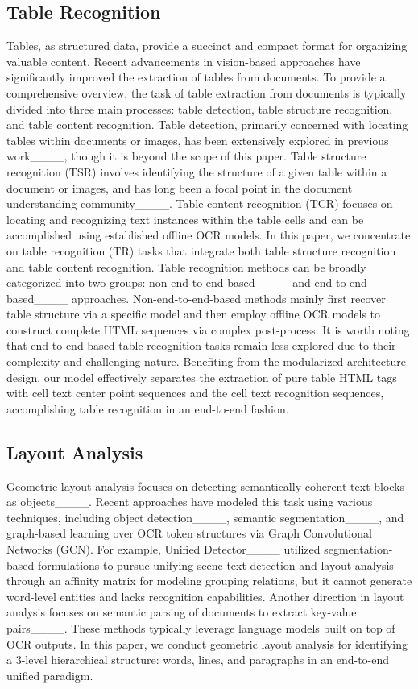 \subsection{Table Recognition}
Tables, as structured data, provide a succinct and compact format for organizing valuable content. Recent advancements in vision-based approaches have significantly improved the extraction of tables from documents. To provide a comprehensive overview, the task of table extraction from documents is typically divided into three main processes: table detection, table structure recognition, and table content recognition. Table detection, primarily concerned with locating tables within documents or images, has been extensively explored in previous work____, though it is beyond the scope of this paper. Table structure recognition (TSR) involves identifying the structure of a given table within a document or images, and has long been a focal point in the document understanding community____. Table content recognition (TCR) focuses on locating and recognizing text instances within the table cells and can be accomplished using established offline OCR models. In this paper, we concentrate on table recognition (TR) tasks that integrate both table structure recognition and table content recognition. Table recognition methods can be broadly categorized into two groups: non-end-to-end-based____ and end-to-end-based____ approaches. Non-end-to-end-based methods mainly first recover table structure via a specific model and then employ offline OCR models to construct complete HTML sequences via complex post-process. It is worth noting that end-to-end-based table recognition tasks remain less explored due to their complexity and challenging nature. Benefiting from the modularized architecture design, our model effectively separates the extraction of pure table HTML tags with cell text center point sequences and the cell text recognition sequences, accomplishing table recognition in an end-to-end fashion.
    
\subsection{Layout Analysis}
Geometric layout analysis focuses on detecting semantically coherent text blocks as objects____. Recent approaches have modeled this task using various techniques, including object detection____, semantic segmentation____, and graph-based learning over OCR token structures via Graph Convolutional Networks (GCN). For example, Unified Detector____ utilized segmentation-based formulations to pursue unifying scene text detection and layout analysis through an affinity matrix for modeling grouping relations, but it cannot generate word-level entities and lacks recognition capabilities. Another direction in layout analysis focuses on semantic parsing of documents to extract key-value pairs____. These methods typically leverage language models built on top of OCR outputs. In this paper, we conduct geometric layout analysis for identifying a 3-level hierarchical structure: words, lines, and paragraphs in an end-to-end unified paradigm.

